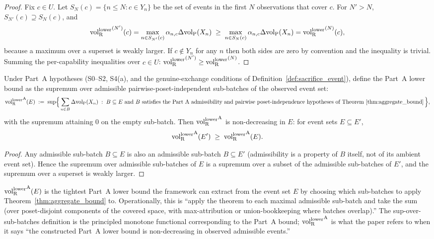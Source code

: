 \begin{proof}
Fix $c \in U$.  Let $S_N(c) = \{n \leq N : c \in Y_n\}$ be the
set of events in the first $N$ observations that cover $c$.  For
$N' > N$, $S_{N'}(c) \supseteq S_N(c)$, and
\[
  {\operatorname{vol}_{\mathrm{R}}^{\mathrm{lower}}}^{(N')}(c)
  = \max_{n \in S_{N'}(c)} \alpha_{n,c} \Delta{\operatorname{vol}_{\mathrm{P}}}(X_n)
  \;\geq\;
  \max_{n \in S_N(c)} \alpha_{n,c} \Delta{\operatorname{vol}_{\mathrm{P}}}(X_n)
  = {\operatorname{vol}_{\mathrm{R}}^{\mathrm{lower}}}^{(N)}(c),
\]
because a maximum over a superset is weakly larger.  If
$c \notin Y_n$ for any $n$ then both sides are zero by convention
and the inequality is trivial.  Summing the per-capability
inequalities over $c \in U$:
${\operatorname{vol}_{\mathrm{R}}^{\mathrm{lower}}}^{(N')} \geq {\operatorname{vol}_{\mathrm{R}}^{\mathrm{lower}}}^{(N)}$.
\end{proof}

\begin{proposition}
\label{prop:monotone_part_a}
Under Part~A hypotheses (S0--S2, S4(a), and the
genuine-exchange conditions of
Definition~\ref{def:sacrifice_event}), define the Part~A lower
bound as the supremum over admissible pairwise-poset-independent
sub-batches of the observed event set:
\[
  {\operatorname{vol}_{\mathrm{R}}^{\mathrm{lower}}}^{\mathrm{A}}(E) \;:=\;
  \sup\Bigl\{\, \sum_{n \in B} \Delta{\operatorname{vol}_{\mathrm{P}}}(X_n)
  \;:\; B \subseteq E \text{ and } B \text{ satisfies the
  Part~A admissibility and pairwise poset-independence
  hypotheses of Theorem~\ref{thm:aggregate_bound}} \,\Bigr\},
\]
with the supremum attaining $0$ on the empty sub-batch.  Then
${\operatorname{vol}_{\mathrm{R}}^{\mathrm{lower}}}^{\mathrm{A}}$ is non-decreasing in $E$: for event
sets $E \subseteq E'$,
\[
  {\operatorname{vol}_{\mathrm{R}}^{\mathrm{lower}}}^{\mathrm{A}}(E') \;\geq\;
  {\operatorname{vol}_{\mathrm{R}}^{\mathrm{lower}}}^{\mathrm{A}}(E).
\]
\end{proposition}

\begin{proof}
Any admissible sub-batch $B \subseteq E$ is also an admissible
sub-batch $B \subseteq E'$ (admissibility is a property of $B$
itself, not of its ambient event set).  Hence the supremum over
admissible sub-batches of $E$ is a supremum over a subset of the
admissible sub-batches of $E'$, and the supremum over a superset
is weakly larger.
\end{proof}

\begin{remark}
\label{rem:part_a_monotone_interp}
${\operatorname{vol}_{\mathrm{R}}^{\mathrm{lower}}}^{\mathrm{A}}(E)$ is the tightest Part~A lower bound
the framework can extract from the event set $E$ by choosing
which sub-batches to apply Theorem~\ref{thm:aggregate_bound} to.
Operationally, this is ``apply the theorem to each maximal
admissible sub-batch and take the sum (over poset-disjoint
components of the covered space, with max-attribution or
union-bookkeeping where batches overlap).''  The sup-over-
sub-batches definition is the principled monotone functional
corresponding to the Part~A bound; ${\operatorname{vol}_{\mathrm{R}}^{\mathrm{lower}}}^{\mathrm{A}}$ is
what the paper refers to when it says ``the constructed Part~A
lower bound is non-decreasing in observed admissible events.''
\end{remark}
